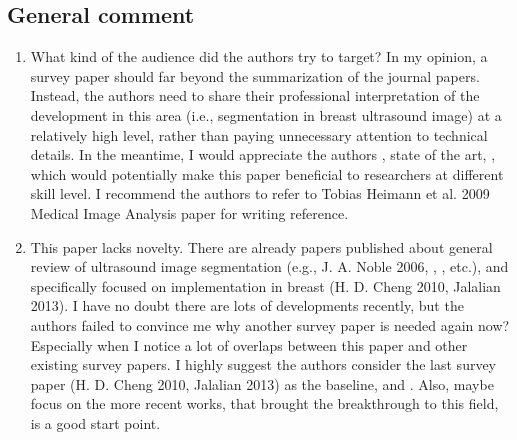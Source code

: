 \documentclass[]{tufte-handout}
\begin{document}
\subsection{General comment}
\begin{enumerate}
\item What kind of the audience did the authors try to target? In my opinion, a survey paper should far beyond the summarization of the journal papers. Instead, the authors need to share their professional interpretation of the development in this area (i.e., segmentation in breast ultrasound image) at a relatively high level, rather than paying unnecessary attention to technical details. In the meantime, I would appreciate the authors , state of the art, , which would potentially make this paper beneficial to researchers at different skill level. I recommend the authors to refer to Tobias Heimann et al. 2009 Medical Image Analysis paper for writing reference.

\item This paper lacks novelty. There are already papers published about general review of ultrasound image segmentation (e.g., J. A. Noble 2006, , , etc.), and specifically focused on implementation in breast (H. D. Cheng 2010, Jalalian 2013). I have no doubt there are lots of developments recently, but the authors failed to convince me why another survey paper is needed again now? Especially when I notice a lot of overlaps between this paper and other existing survey papers. I highly suggest the authors consider the last survey paper (H. D. Cheng 2010, Jalalian 2013) as the baseline, and .  Also, maybe focus on the more recent works, that brought the breakthrough to this field, is a good start point.


\end{enumerate}
\end{document}
